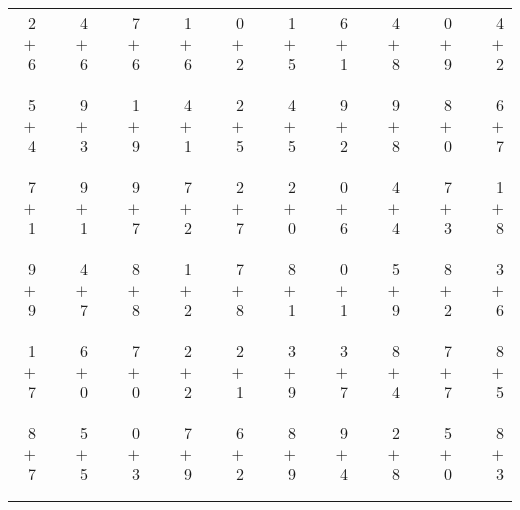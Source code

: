 \documentclass[12pt, letterpaper]{article}
\begin{document}
\begin{tabular}{rrrrrrrrrrrrrrrrrrr}
2 & & 4 & & 7 & & 1 & & 0 & & 1 & & 6 & & 4 & & 0 & & 4\\
$+$ 6 & & $+$ 6 & & $+$ 6 & & $+$ 6 & & $+$ 2 & & $+$ 5 & & $+$ 1 & & $+$ 8 & & $+$ 9 & & $+$ 2\\
\cline{1-1} \cline{3-3} \cline{5-5} \cline{7-7} \cline{9-9} \cline{11-11} \cline{13-13} \cline{15-15} \cline{17-17} \cline{19-19} \\ \\
5 & & 9 & & 1 & & 4 & & 2 & & 4 & & 9 & & 9 & & 8 & & 6\\
$+$ 4 & & $+$ 3 & & $+$ 9 & & $+$ 1 & & $+$ 5 & & $+$ 5 & & $+$ 2 & & $+$ 8 & & $+$ 0 & & $+$ 7\\
\cline{1-1} \cline{3-3} \cline{5-5} \cline{7-7} \cline{9-9} \cline{11-11} \cline{13-13} \cline{15-15} \cline{17-17} \cline{19-19} \\ \\
7 & & 9 & & 9 & & 7 & & 2 & & 2 & & 0 & & 4 & & 7 & & 1\\
$+$ 1 & & $+$ 1 & & $+$ 7 & & $+$ 2 & & $+$ 7 & & $+$ 0 & & $+$ 6 & & $+$ 4 & & $+$ 3 & & $+$ 8\\
\cline{1-1} \cline{3-3} \cline{5-5} \cline{7-7} \cline{9-9} \cline{11-11} \cline{13-13} \cline{15-15} \cline{17-17} \cline{19-19} \\ \\
9 & & 4 & & 8 & & 1 & & 7 & & 8 & & 0 & & 5 & & 8 & & 3\\
$+$ 9 & & $+$ 7 & & $+$ 8 & & $+$ 2 & & $+$ 8 & & $+$ 1 & & $+$ 1 & & $+$ 9 & & $+$ 2 & & $+$ 6\\
\cline{1-1} \cline{3-3} \cline{5-5} \cline{7-7} \cline{9-9} \cline{11-11} \cline{13-13} \cline{15-15} \cline{17-17} \cline{19-19} \\ \\
1 & & 6 & & 7 & & 2 & & 2 & & 3 & & 3 & & 8 & & 7 & & 8\\
$+$ 7 & & $+$ 0 & & $+$ 0 & & $+$ 2 & & $+$ 1 & & $+$ 9 & & $+$ 7 & & $+$ 4 & & $+$ 7 & & $+$ 5\\
\cline{1-1} \cline{3-3} \cline{5-5} \cline{7-7} \cline{9-9} \cline{11-11} \cline{13-13} \cline{15-15} \cline{17-17} \cline{19-19} \\ \\
8 & & 5 & & 0 & & 7 & & 6 & & 8 & & 9 & & 2 & & 5 & & 8\\
$+$ 7 & & $+$ 5 & & $+$ 3 & & $+$ 9 & & $+$ 2 & & $+$ 9 & & $+$ 4 & & $+$ 8 & & $+$ 0 & & $+$ 3\\
\cline{1-1} \cline{3-3} \cline{5-5} \cline{7-7} \cline{9-9} \cline{11-11} \cline{13-13} \cline{15-15} \cline{17-17} \cline{19-19} \\ \\

\end{tabular}
\end{document}
